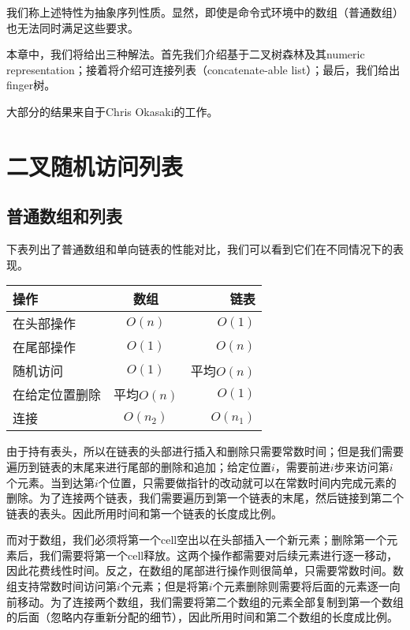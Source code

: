 \documentclass[UTF8]{article}
\begin{document}
我们称上述特性为抽象序列性质。显然，即使是命令式环境中的数组（普通数组）也无法同时满足这些要求。

本章中，我们将给出三种解法。首先我们介绍基于二叉树森林及其numeric representation；接着将介绍可连接列表（concatenate-able list）；最后，我们给出finger树。

大部分的结果来自于Chris Okasaki的工作\cite{okasaki-book}。

\section{二叉随机访问列表}

\subsection{普通数组和列表}

下表列出了普通数组和单向链表的性能对比，我们可以看到它们在不同情况下的表现。

\begin{tabular}{l | c | r}
  \hline
  操作 & 数组 & 链表 \\
  \hline
  在头部操作 & $O(n)$ & $O(1)$ \\
  在尾部操作 & $O(1)$ & $O(n)$ \\
  随机访问 & $O(1)$ & 平均$O(n)$ \\
  在给定位置删除 & 平均$O(n)$ & $O(1)$ \\
  连接 & $O(n_2)$ & $O(n_1)$ \\
  \hline
\end{tabular}

由于持有表头，所以在链表的头部进行插入和删除只需要常数时间；但是我们需要遍历到链表的末尾来进行尾部的删除和追加；给定位置$i$，需要前进$i$步来访问第$i$个元素。当到达第$i$个位置，只需要做指针的改动就可以在常数时间内完成元素的删除。为了连接两个链表，我们需要遍历到第一个链表的末尾，然后链接到第二个链表的表头。因此所用时间和第一个链表的长度成比例。

而对于数组，我们必须将第一个cell空出以在头部插入一个新元素；删除第一个元素后，我们需要将第一个cell释放。这两个操作都需要对后续元素进行逐一移动，因此花费线性时间。反之，在数组的尾部进行操作则很简单，只需要常数时间。数组支持常数时间访问第$i$个元素；但是将第$i$个元素删除则需要将后面的元素逐一向前移动。为了连接两个数组，我们需要将第二个数组的元素全部复制到第一个数组的后面（忽略内存重新分配的细节），因此所用时间和第二个数组的长度成比例。
\end{document}
